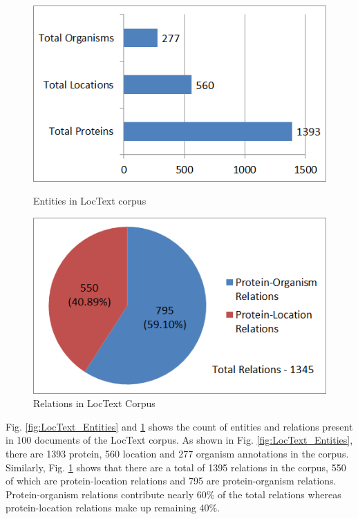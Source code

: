 \begin{figure}
\centering
\begin{minipage}{.5\textwidth}
  \centering
  \includegraphics[width=.95\textwidth]{figures/ProtLocOrg_Distribution.png}
  \caption{Entities in LocText corpus}
  \label{fig:LocText_Entities}
\end{minipage}%
\begin{minipage}{.5\textwidth}
  \centering
  \includegraphics[width=.95\textwidth]{figures/AllRelationsPie.png}
  \caption{Relations in LocText Corpus}
  \label{fig:LocText_Relations}
\end{minipage}
\end{figure}

Fig. \ref{fig:LocText_Entities} and \ref{fig:LocText_Relations} shows the count of entities and relations present in 100 documents of the LocText corpus. As shown in  Fig. \ref{fig:LocText_Entities}, there are 1393 protein, 560 location and 277 organism annotations in the corpus. Similarly, Fig. \ref{fig:LocText_Relations} shows that there are a total of 1395 relations in the corpus, 550 of which are protein-location relations and 795 are protein-organism relations. Protein-organism relations contribute nearly 60\% of the total relations whereas protein-location relations make up remaining 40\%.

